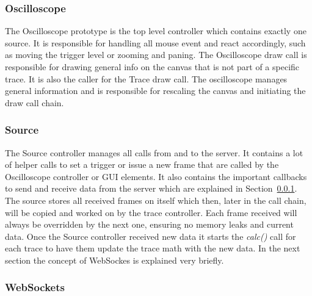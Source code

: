 \subsubsection*{Oscilloscope}

The Oscilloscope prototype is the top level controller which contains exactly one source. It is responsible for handling all mouse event and react accordingly, such as moving the trigger level or zooming and paning.
The Oscilloscope draw call is responsible for drawing general info on the canvas that is not part of a specific trace.
It is also the caller for the Trace draw call. The oscilloscope manages general information and is responsible for rescaling the canvas and initiating the draw call chain.

\subsubsection*{Source}

The Source controller manages all calls from and to the server. It contains a lot of helper calls to set a trigger or issue a new frame that are called by the Oscilloscope controller or GUI elements.
It also contains the important callbacks to send and receive data from the server which are explained in Section~\ref{subsec:gui:websockets}.
The source stores all received frames on itself which then, later in the call chain, will be copied and worked on by the trace controller.
Each frame received will always be overridden by the next one, ensuring no memory leaks and current data.
Once the Source controller received new data it starts the \textit{calc()} call for each trace to have them update the trace math with the new data.
In the next section the concept of WebSockes is explained very briefly. 

%
%

\subsubsection{WebSockets}
\label{subsec:gui:websockets}

